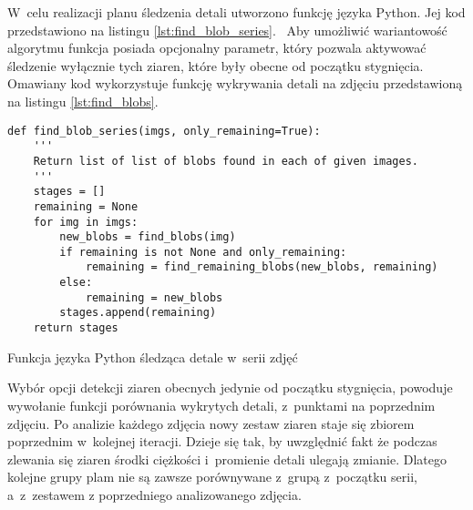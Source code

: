 W~celu realizacji planu śledzenia detali utworzono funkcję języka Python.
Jej kod przedstawiono na listingu \ref{lst:find_blob_series}.~%
Aby umożliwić wariantowość algorytmu funkcja posiada opcjonalny parametr, który
pozwala aktywować śledzenie wyłącznie tych ziaren, które były obecne od początku
stygnięcia.
Omawiany kod wykorzystuje funkcję wykrywania detali na zdjęciu przedstawioną na
listingu \ref{lst:find_blobs}.~%
\begin{listing}[tb]
\begin{verbatim}
def find_blob_series(imgs, only_remaining=True):
    '''
    Return list of list of blobs found in each of given images.
    '''
    stages = []
    remaining = None
    for img in imgs:
        new_blobs = find_blobs(img)
        if remaining is not None and only_remaining:
            remaining = find_remaining_blobs(new_blobs, remaining)
        else:
            remaining = new_blobs
        stages.append(remaining)
    return stages
\end{verbatim}
\caption{Funkcja języka Python śledząca detale w~serii zdjęć}
\label{lst:find_blob_series}
\end{listing}
Wybór opcji detekcji ziaren obecnych jedynie od początku stygnięcia, powoduje
wywołanie funkcji porównania wykrytych detali, z~punktami na poprzednim zdjęciu.
Po analizie każdego zdjęcia nowy zestaw ziaren staje się zbiorem poprzednim
w~kolejnej iteracji.
Dzieje się tak, by uwzględnić fakt że podczas zlewania się ziaren środki
ciężkości i~promienie detali ulegają zmianie.
Dlatego kolejne grupy plam nie są zawsze porównywane z~grupą z~początku serii,
a~z~zestawem z poprzedniego analizowanego zdjęcia.

